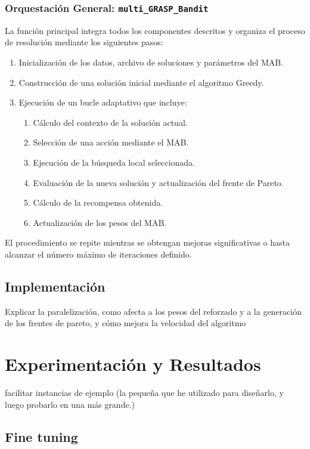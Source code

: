 \documentclass[12pt,a4paper]{book}
\begin{document}
\subsection{Orquestación General: \texttt{multi\_GRASP\_Bandit}}
La función principal integra todos los componentes descritos y organiza el proceso de resolución mediante los siguientes pasos:  

\begin{enumerate}
    \item Inicialización de los datos, archivo de soluciones y parámetros del MAB.
    \item Construcción de una solución inicial mediante el algoritmo Greedy.
    \item Ejecución de un bucle adaptativo que incluye:
    \begin{enumerate}
        \item Cálculo del contexto de la solución actual.
        \item Selección de una acción mediante el MAB.
        \item Ejecución de la búsqueda local seleccionada.
        \item Evaluación de la nueva solución y actualización del frente de Pareto.
        \item Cálculo de la recompensa obtenida.
        \item Actualización de los pesos del MAB.
    \end{enumerate}
\end{enumerate}

El procedimiento se repite mientras se obtengan mejoras significativas o hasta alcanzar el número máximo de iteraciones definido. 

\section{Implementación}

Explicar la paralelización, como afecta a los pesos del reforzado y a la generación de los frentes de pareto, y cómo mejora la velocidad del algoritmo

\chapter{Experimentación y Resultados}

facilitar instancias de ejemplo (la pequeña que he utilizado para diseñarlo, y luego probarlo en una más grande.)

\section{Fine tuning}
\end{document}
